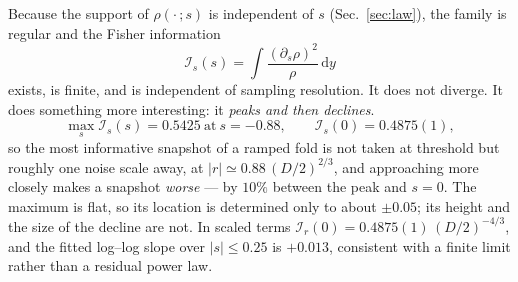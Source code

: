 \documentclass[%
 aip,
 cha,
 amsmath,amssymb,
 reprint,
 superscriptaddress,
 floatfix,
]{revtex4-2}
\newcommand{\dd}{\mathrm{d}}
\newcommand{\Ifish}{\mathcal{I}}
\begin{document}
Because the support of $\rho(\cdot\,;s)$ is independent of $s$ (Sec.~\ref{sec:law}), the family is regular and the Fisher information
\begin{equation}
\label{eq:Idef}
\Ifish_s(s)=\int\frac{(\partial_s\rho)^2}{\rho}\,\dd y
\end{equation}
exists, is finite, and is independent of sampling resolution.  It does not diverge.  It does something more interesting: it \emph{peaks and then declines}.
\begin{equation}
\label{eq:plateau}
\max_s\Ifish_s(s)=0.5425\ \text{at}\ s=-0.88,
\qquad
\Ifish_s(0)=0.4875(1),
\end{equation}
so the most informative snapshot of a ramped fold is not taken at threshold but roughly one noise scale away, at $|r|\simeq0.88\,(D/2)^{2/3}$, and approaching more closely makes a snapshot \emph{worse} --- by $10\%$ between the peak and $s=0$.  The maximum is flat, so its location is determined only to about $\pm0.05$; its height and the size of the decline are not.  In scaled terms $\Ifish_r(0)=0.4875(1)\,(D/2)^{-4/3}$, and the fitted log--log slope over $|s|\le0.25$ is $+0.013$, consistent with a finite limit rather than a residual power law.
\end{document}
